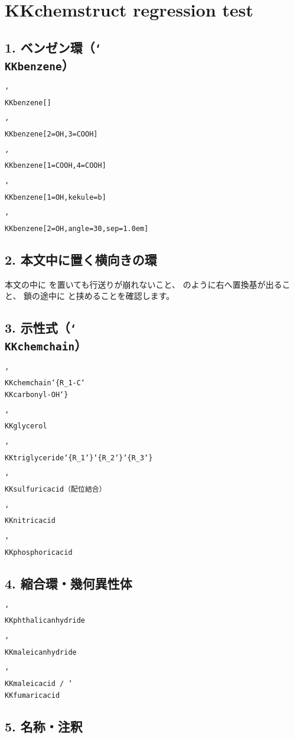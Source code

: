 \documentclass[a4paper,11pt]{ltjsarticle}
\newcommand{\bs}{\char`\\}
\newcommand{\bl}{\char`\{}
\newcommand{\br}{\char`\}}
\newcommand{\demo}[2]{\par\medskip\noindent\texttt{#1}\par\smallskip\noindent#2\par}
\begin{document}
\section*{KKchemstruct regression test}

\subsection*{1. ベンゼン環（\texttt{\bs KKbenzene}）}

\demo{\bs KKbenzene[]}{\KKbenzene[]}
\demo{\bs KKbenzene[2=OH,3=COOH]}{\KKbenzene[2=OH,3=COOH]}
\demo{\bs KKbenzene[1=COOH,4=COOH]}{\KKterephthalicacid}
\demo{\bs KKbenzene[1=OH,kekule=b]}{\KKbenzene[1=OH,kekule=b]}
\demo{\bs KKbenzene[2=OH,angle=30,sep=1.0em]}{\KKbenzene[2=OH,angle=30,sep=1.0em]}

\subsection*{2. 本文中に置く横向きの環}

本文の中に \KKphenylring{} を置いても行送りが崩れないこと、
 のように右へ置換基が出ること、
鎖の途中に  と挟めることを確認します。

\subsection*{3. 示性式（\texttt{\bs KKchemchain}）}

\demo{\bs KKchemchain\bl R\_1-C\bs KKcarbonyl-OH\br}{\KKestergeneric}
\demo{\bs KKglycerol}{\KKglycerol}
\demo{\bs KKtriglyceride\bl R\_1\br\bl R\_2\br\bl R\_3\br}{\KKtriglyceride{R_1}{R_2}{R_3}}
\demo{\bs KKsulfuricacid（配位結合）}{\KKsulfuricacid}
\demo{\bs KKnitricacid}{\KKnitricacid}
\demo{\bs KKphosphoricacid}{\KKphosphoricacid}

\subsection*{4. 縮合環・幾何異性体}

\demo{\bs KKphthalicanhydride}{\KKphthalicanhydride}
\demo{\bs KKmaleicanhydride}{\KKmaleicanhydride}
\demo{\bs KKmaleicacid / \bs KKfumaricacid}%
  {\KKmaleicacid\hspace{4em}\KKfumaricacid}

\subsection*{5. 名称・注釈}
\end{document}
